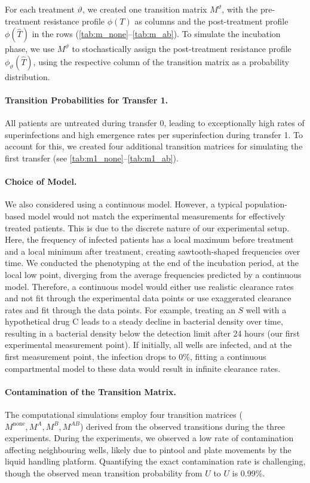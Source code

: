 For each treatment $\vartheta$, we created one transition matrix $M^\vartheta$, with the pre-treatment resistance profile $\phi(T)$ as columns and the post-treatment profile $\phi(\hat{T})$ in the rows (\autoref{tab:m_none}--\ref{tab:m_ab}).
To simulate the incubation phase, we use $M^\vartheta$ to stochastically assign the post-treatment resistance profile $\phi_\vartheta(\hat{T})$, using the respective column of the transition matrix as a probability distribution.

\paragraph{Transition Probabilities for Transfer 1.}
All patients are untreated during transfer 0, leading to exceptionally high rates of superinfections and high emergence rates per superinfection during transfer 1.
To account for this, we created four additional transition matrices for simulating the first transfer (see \autoref{tab:m1_none}--\ref{tab:m1_ab}).

\paragraph{Choice of Model.}
We also considered using a continuous model.
However, a typical population-based model would not match the experimental measurements for effectively treated patients.
This is due to the discrete nature of our experimental setup.
Here, the frequency of infected patients has a local maximum before treatment and a local minimum after treatment, creating sawtooth-shaped frequencies over time.
We conducted the phenotyping at the end of the incubation period, at the local low point, diverging from the average frequencies predicted by a continuous model.
Therefore, a continuous model would either use realistic clearance rates and not fit through the experimental data points or use exaggerated clearance rates and fit through the data points.
For example, treating an $S$ well with a hypothetical drug C leads to a steady decline in bacterial density over time, resulting in a bacterial density below the detection limit after 24 hours (our first experimental measurement point).
If initially, all wells are infected, and at the first measurement point, the infection drops to 0\%, fitting a continuous compartmental model to these data would result in infinite clearance rates.

\paragraph{Contamination of the Transition Matrix. \label{par:contamination}}
The computational simulations employ four transition matrices  (\(M^\text{none}, M^{A}, M^{B}, M^{AB}\)) derived from the observed transitions during the three experiments.
During the experiments, we observed a low rate of contamination affecting neighbouring wells, likely due to pintool and plate movements by the liquid handling platform.
Quantifying the exact contamination rate is challenging, though the observed mean transition probability from \( U \) to \( U \) is 0.99\%.

